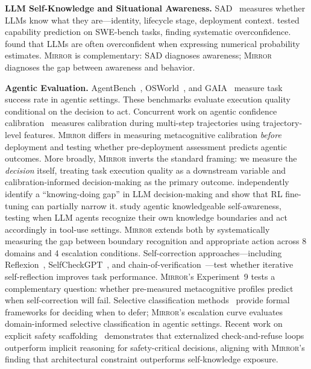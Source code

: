 \documentclass[10pt]{article}
\newcommand{\mirror}{\textsc{Mirror}}
\begin{document}
\textbf{LLM Self-Knowledge and Situational Awareness.}
SAD~\citep{laine2024me} measures whether LLMs know what they are---identity,
lifecycle stage, deployment context. \citet{barkan2025llms} tested capability
prediction on SWE-bench tasks, finding systematic overconfidence.
\citet{xiong2023can} found that LLMs are often overconfident when expressing
numerical probability estimates. \mirror{} is complementary: SAD diagnoses
awareness; \mirror{} diagnoses the gap between awareness and behavior.

\textbf{Agentic Evaluation.}
AgentBench~\citep{liu2023agentbench}, OSWorld~\citep{xie2024osworld}, and
GAIA~\citep{mialon2023gaia} measure task success rate in agentic settings. These
benchmarks evaluate execution quality conditional on the decision to act.
Concurrent work on agentic confidence calibration~\citep{htc2026} measures
calibration during multi-step trajectories using trajectory-level features.
\mirror{} differs in measuring metacognitive calibration \textit{before} deployment
and testing whether pre-deployment assessment predicts agentic outcomes. More
broadly, \mirror{} inverts the standard framing: we measure the \textit{decision}
itself, treating task execution quality as a downstream variable and
calibration-informed decision-making as the primary outcome.
\citet{schmied2026greedy} independently identify a ``knowing-doing gap'' in LLM
decision-making and show that RL fine-tuning can partially narrow it.
\citet{qiao2025agentic} study agentic knowledgeable self-awareness, testing when
LLM agents recognize their own knowledge boundaries and act accordingly in
tool-use settings. \mirror{} extends both by systematically measuring the gap
between boundary recognition and appropriate action across 8 domains and 4
escalation conditions.
Self-correction approaches---including Reflexion~\citep{shinn2023reflexion},
SelfCheckGPT~\citep{manakul2023selfcheckgpt}, and
chain-of-verification~\citep{dhuliawala2023chainofverification}---test whether
iterative self-reflection improves task performance. \mirror{}'s Experiment~9
tests a complementary question: whether pre-measured metacognitive profiles predict
when self-correction will fail. Selective classification
methods~\citep{geifman2017selective} provide formal frameworks for deciding when
to defer; \mirror{}'s escalation curve evaluates domain-informed selective
classification in agentic settings.
Recent work on explicit safety scaffolding~\citep{mosaic2026} demonstrates that
externalized check-and-refuse loops outperform implicit reasoning for
safety-critical decisions, aligning with \mirror{}'s finding that architectural
constraint outperforms self-knowledge exposure.
\end{document}
